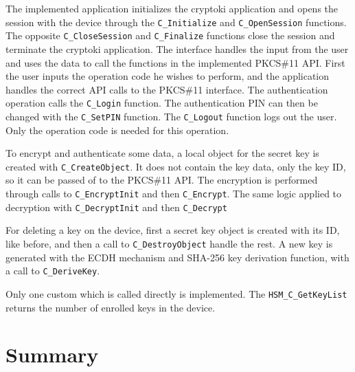The implemented application initializes the cryptoki application and opens the session with the device through the \texttt{C\_Initialize} and \texttt{C\_OpenSession} functions.
The opposite \texttt{C\_CloseSession} and \texttt{C\_Finalize} functions close the session and terminate the cryptoki application.
The interface handles the input from the user and uses the data to call the functions in the implemented PKCS\#11 API.
First the user inputs the operation code he wishes to perform, and the application handles the correct API calls to the PKCS\#11 interface.
The authentication operation calls the \texttt{C\_Login} function. The authentication PIN can then be changed with the \texttt{C\_SetPIN} function.
The \texttt{C\_Logout} function logs out the user. Only the operation code is needed for this operation.

To encrypt and authenticate some data, a local object for the secret key is created with \texttt{C\_CreateObject}. It does not contain the key data, only the key ID, so it can be passed of to the PKCS\#11 API. The encryption is performed through calls to \texttt{C\_EncryptInit} and then \texttt{C\_Encrypt}.
The same logic applied to decryption with \texttt{C\_DecryptInit} and then \texttt{C\_Decrypt}

For deleting a key on the device, first a secret key object is created with its ID, like before, and then a call to \texttt{C\_DestroyObject} handle the rest.
A new key is generated with the ECDH mechanism and \ac{SHA}-256 key derivation function, with a call to \texttt{C\_DeriveKey}.

Only one custom which is called directly is implemented. The \texttt{HSM\_C\_GetKeyList} returns the number of enrolled keys in the device.

\section{Summary}\label{chap:implementation:summary}
